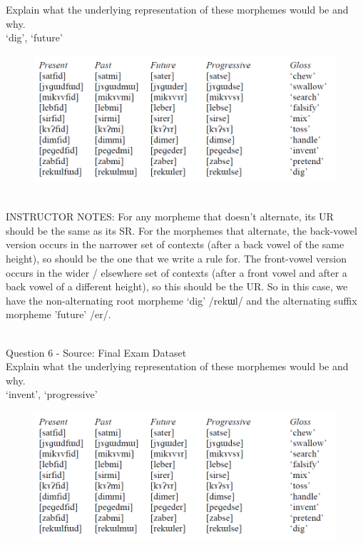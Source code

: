 \documentclass[12pt]{article}
\begin{document}
Explain what the underlying representation of these morphemes would be and why.\\

`dig', `future'

\begin{figure}[H]
\includegraphics{../images/final_dataset.png}
\end{figure}

~\\
INSTRUCTOR NOTES: For any morpheme that doesn’t alternate, its UR should be the same as its SR.  For the morphemes that alternate, the back-vowel version occurs in the narrower set of contexts (after a back vowel of the same height), so should be the one that we write a rule for. The front-vowel version occurs in the wider / elsewhere set of contexts (after a front vowel and after a back vowel of a different height), so this should be the UR. So in this case, we have the non-alternating root morpheme ‘dig’ /rekɯl/ and the alternating suffix morpheme 'future' /er/.


~\\

{\large Question 6} - Source: Final Exam Dataset\\

Explain what the underlying representation of these morphemes would be and why.\\

`invent', `progressive'

\begin{figure}[H]
\includegraphics{../images/final_dataset.png}
\end{figure}
\end{document}
